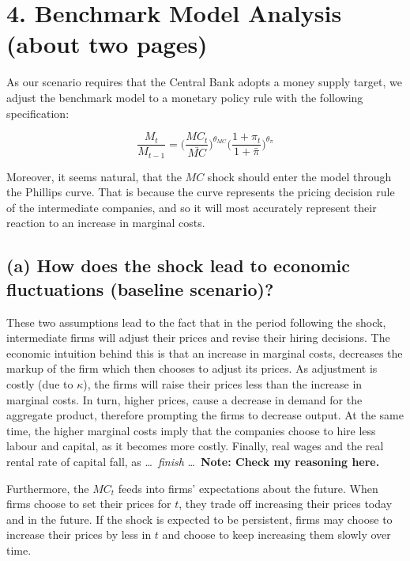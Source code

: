 \documentclass[12pt]{article}
\begin{document}

\section*{4. Benchmark Model Analysis (about two pages)}

As our scenario requires that the Central Bank adopts a money supply target, we adjust the benchmark model to a monetary policy rule with the following specification: 

\begin{equation}
    \frac{M_t}{M_{t-1}} = \Big(\frac{MC_{t}}{\bar{MC}}\Big)^{\theta_{MC}} \Big(\frac{1+\pi_{t}}{1+ \bar \pi}\Big)^{\theta_{\pi}}
\end{equation}

Moreover, it seems natural, that the $MC$ shock should enter the model through the Phillips curve. That is because the curve represents the pricing decision rule of the intermediate companies, and so it will most accurately represent their reaction to an increase in marginal costs.

\subsection*{(a) How does the shock lead to economic fluctuations (baseline scenario)?}

These two assumptions lead to the fact that in the period following the shock, intermediate firms will adjust their prices and revise their hiring decisions. The economic intuition behind this is that an increase in marginal costs, decreases the markup of the firm which then chooses to adjust its prices. As adjustment is costly (due to $\kappa$), the firms will raise their prices less than the increase in marginal costs. In turn, higher prices, cause a decrease in demand for the aggregate product, therefore prompting the firms to decrease output. At the same time, the higher marginal costs imply that the companies choose to hire less labour and capital, as it becomes more costly. Finally, real wages and the real rental rate of capital fall, as \dots\ \textit{finish} \dots\ \textbf{Note: Check my reasoning here.}

Furthermore, the $MC_t$ feeds into firms' expectations about the future. When firms choose to set their prices for $t$, they trade off increasing their prices today and in the future. If the shock is expected to be persistent, firms may choose to increase their prices by less in $t$ and choose to keep increasing them slowly over time. 
\end{document}
